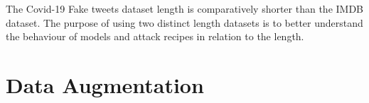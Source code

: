 \documentclass[%
	BCOR=8mm, %
	DIV=12,
	toc=bibliography, %
	toc=listof, %
	oneside, %
	egregdoesnotlikesansseriftitles, %
	]{scrbook}
\begin{document}
The Covid-19 Fake tweets dataset  length is comparatively shorter than the IMDB dataset. The purpose of using two distinct length datasets is to better understand the behaviour of models and attack recipes in relation to the length.

\section{Data Augmentation}
\label{section:dataaugmentation}
\end{document}
